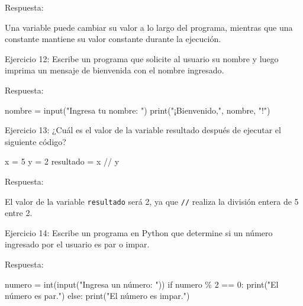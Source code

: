 \documentclass[
  a4paper,
  DIV=11,
  numbers=noendperiod,
  onepage,
  openany]{scrreprt}
\newenvironment{Shaded}{\begin{snugshade}}{\end{snugshade}}
\newcommand{\BuiltInTok}[1]{\textcolor[rgb]{0.00,0.23,0.31}{#1}}
\newcommand{\ControlFlowTok}[1]{\textcolor[rgb]{0.00,0.23,0.31}{#1}}
\newcommand{\DecValTok}[1]{\textcolor[rgb]{0.68,0.00,0.00}{#1}}
\newcommand{\NormalTok}[1]{\textcolor[rgb]{0.00,0.23,0.31}{#1}}
\newcommand{\OperatorTok}[1]{\textcolor[rgb]{0.37,0.37,0.37}{#1}}
\newcommand{\StringTok}[1]{\textcolor[rgb]{0.13,0.47,0.30}{#1}}
\begin{document}
Respuesta:

Una variable puede cambiar su valor a lo largo del programa, mientras
que una constante mantiene su valor constante durante la ejecución.

Ejercicio 12: Escribe un programa que solicite al usuario su nombre y
luego imprima un mensaje de bienvenida con el nombre ingresado.

Respuesta:

\begin{Shaded}
\begin{Highlighting}[]
\NormalTok{nombre }\OperatorTok{=} \BuiltInTok{input}\NormalTok{(}\StringTok{"Ingresa tu nombre: "}\NormalTok{)}
\BuiltInTok{print}\NormalTok{(}\StringTok{"¡Bienvenido,"}\NormalTok{, nombre, }\StringTok{"!"}\NormalTok{)}
\end{Highlighting}
\end{Shaded}

Ejercicio 13: ¿Cuál es el valor de la variable resultado después de
ejecutar el siguiente código?

\begin{Shaded}
\begin{Highlighting}[]
\NormalTok{x }\OperatorTok{=} \DecValTok{5}
\NormalTok{y }\OperatorTok{=} \DecValTok{2}
\NormalTok{resultado }\OperatorTok{=}\NormalTok{ x }\OperatorTok{//}\NormalTok{ y}
\end{Highlighting}
\end{Shaded}

Respuesta:

El valor de la variable \texttt{resultado} será 2, ya que \texttt{//}
realiza la división entera de 5 entre 2.

Ejercicio 14: Escribe un programa en Python que determine si un número
ingresado por el usuario es par o impar.

Respuesta:

\begin{Shaded}
\begin{Highlighting}[]
\NormalTok{numero }\OperatorTok{=} \BuiltInTok{int}\NormalTok{(}\BuiltInTok{input}\NormalTok{(}\StringTok{"Ingresa un número: "}\NormalTok{))}
\ControlFlowTok{if}\NormalTok{ numero }\OperatorTok{\%} \DecValTok{2} \OperatorTok{==} \DecValTok{0}\NormalTok{:}
    \BuiltInTok{print}\NormalTok{(}\StringTok{"El número es par."}\NormalTok{)}
\ControlFlowTok{else}\NormalTok{:}
    \BuiltInTok{print}\NormalTok{(}\StringTok{"El número es impar."}\NormalTok{)}
\end{Highlighting}
\end{Shaded}
\end{document}
